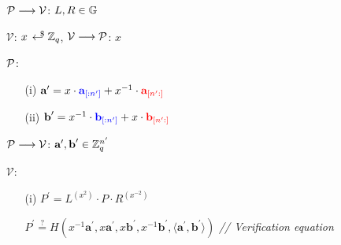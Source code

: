 \begin{mdframed}[skipabove=\topsep]
\begin{itemize}[itemsep=4pt]
        \item[] $\mathcal{P} \longrightarrow \V$: $L,R \in \G$
    
        \item[] $\mathcal{V}$: $x \rgen \Z_q$, $\mathcal{V} \longrightarrow \P$: $x$
    
    
        \item[] $\P$:
        \begin{enumerate}[itemsep=5pt]
            \item[(i)] $\textbf{a}^{\prime} = x \cdot
            \textcolor{blue}{\textbf{a}_{[:n^{\prime}]}} + x^{-1}\cdot
            \textcolor{red}{\textbf{a}_{[n^{\prime}:]}}$

            \item[(ii)] $\textbf{b}^{\prime} = x^{-1} \cdot
            \textcolor{blue}{\textbf{b}_{[:n^{\prime}]}} + x\cdot
            \textcolor{red}{\textbf{b}_{[n^{\prime}:]}}$
        \end{enumerate}
        
        \item[] $\mathcal{P} \longrightarrow \V$: $\textbf{a}^{\prime}, \textbf{b}^{\prime} \in \Z_q^{n^{\prime}}$
        
        \item[] $\mathcal{V}$: 
        \begin{enumerate}[itemsep=5pt]
            \item[(i)] $P^{\prime} = L^{(x^2)}\cdot P \cdot R^{(x^{-2})}$
    
            $P^{\prime} \stackrel{?}{=} H(x^{-1}\textbf{a}^{\prime}, x\textbf{a}^{\prime},x\textbf{b}^{\prime}, x^{-1}\textbf{b}^{\prime}, 
            \langle \textbf{a}^{\prime}, \textbf{b}^{\prime} \rangle)$ \hfill{\footnotesize \textit{// Verification equation}}
        \end{enumerate}
      
    \end{itemize}
\end{mdframed}

